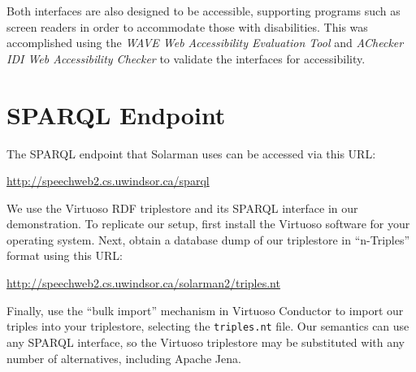 \documentclass[../main.tex]{subfiles}
\begin{document}
Both interfaces are also designed to be accessible, supporting programs such as screen readers in order to accommodate those with disabilities.
This was accomplished using the {\em WAVE Web Accessibility Evaluation Tool}\cite{wave} and {\em AChecker IDI Web Accessibility Checker}\cite{achecker} to validate the interfaces for accessibility.

\section{SPARQL Endpoint}
The SPARQL endpoint that Solarman uses can be accessed via this URL:

\url{http://speechweb2.cs.uwindsor.ca/sparql}

We use the Virtuoso RDF triplestore and its SPARQL interface\cite{virtuoso} in our demonstration.  To replicate our setup,
first install the Virtuoso software for your operating system.  Next, obtain a database dump of our triplestore
in ``n-Triples'' format\cite{w3cntriples} using this URL:

\url{http://speechweb2.cs.uwindsor.ca/solarman2/triples.nt}

Finally, use the ``bulk import'' mechanism in Virtuoso Conductor to import our triples into your triplestore, selecting the \texttt{triples.nt} file.
Our semantics can use any SPARQL interface, so the Virtuoso triplestore may be substituted with any number of alternatives, including Apache Jena\cite{jena2013apache}. 
\end{document}
